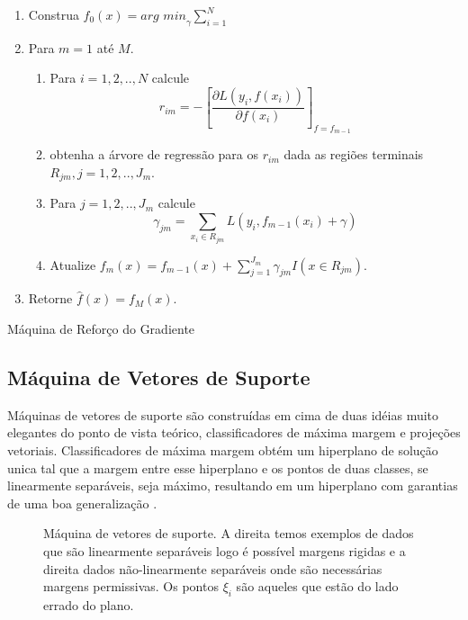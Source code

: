 \begin{algorithm}[ht]
    \begin{enumerate}
        \item Construa $f_0(x) = \textit{arg min}_\gamma \sum_{i=1}^N$
        \item Para $m=1$ até $M$.
        \begin{enumerate}
            \item Para $i=1,2,..,N$ calcule
                \[ r_{im} = - \left[ \frac{\partial L(y_i,f(x_i))}{\partial
                f(x_i)} \right]_{f=f_{m-1}}\]
            \item obtenha a árvore de regressão para os $r_{im}$ dada as
                regiões terminais $R_{jm}, j=1,2,..,J_m$.
            \item Para $j=1,2,..,J_m$ calcule
                \[\gamma_{jm} = \sum_{x_i \in R_{jm}}
                L(y_i,f_{m-1}(x_i)+\gamma)\]
            \item Atualize $f_m(x) = f_{m-1}(x) +
                \sum_{j=1}^{J_m} \gamma_{jm}I(x \in R_{jm})$.
        \end{enumerate}
        \item Retorne $\hat{f}(x) = f_M(x)$.
    \end{enumerate}
    \caption{Máquina de Reforço do Gradiente}
    \label{algo:gbm}
\end{algorithm}


\subsection{Máquina de Vetores de Suporte}
Máquinas de vetores de suporte são construídas em cima de duas idéias muito
elegantes do ponto de vista teórico, classificadores de máxima margem e
projeções vetoriais. Classificadores de máxima margem obtém um hiperplano de
solução unica tal que a margem entre esse hiperplano e os pontos de duas
classes, se linearmente separáveis, seja máximo, resultando em um hiperplano
com garantias de uma boa generalização \cite{vapnik2013nature}.

\begin{figure}[ht]
   \centering
    \begin{subfigure}{.48\textwidth}
        \centering
        \def\svgwidth{\linewidth}
    \end{subfigure}
     \hfill
    \begin{subfigure}{.48\textwidth}
        \centering
        \def\svgwidth{\linewidth}
    \end{subfigure}
    \caption{Máquina de vetores de suporte. A direita temos exemplos de dados
    que são linearmente separáveis logo é possível margens rigidas e a direita
    dados não-linearmente separáveis onde são necessárias margens permissivas.
    Os pontos $\xi_i$ são aqueles que estão do lado errado do plano.}
    \label{fig:svm}
\end{figure}

